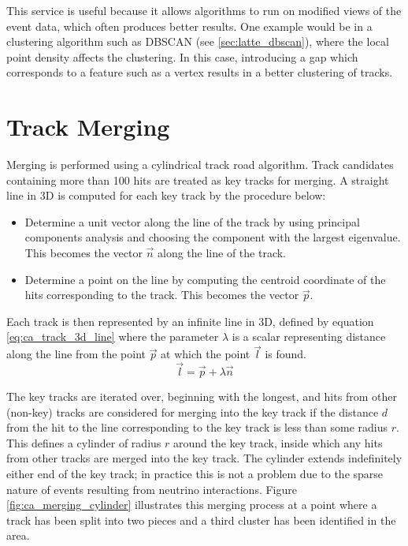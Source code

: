 This service is useful because it allows algorithms to run on modified views of the event data, which often produces better results. One example would be in a clustering algorithm such as DBSCAN (see \ref{sec:latte_dbscan}), where the local point density affects the clustering. In this case, introducing a gap which corresponds to a feature such as a vertex results in a better clustering of tracks.

\section{Track Merging}\label{sec:cellularautomaton_merging}
Merging is performed using a cylindrical track road algorithm. Track candidates containing more than 100 hits are treated as key tracks for merging. A straight line in 3D is computed for each key track by the procedure below:

\begin{itemize}
	\item Determine a unit vector along the line of the track by using principal components analysis and choosing the component with the largest eigenvalue. This becomes the vector $\vec{n}$ along the line of the track.
	\item Determine a point on the line by computing the centroid coordinate of the hits corresponding to the track. This becomes the vector $\vec{p}$.
\end{itemize}

Each track is then represented by an infinite line in 3D, defined by equation \ref{eq:ca_track_3d_line} where the parameter $\lambda$ is a scalar representing distance along the line from the point $\vec{p}$ at which the point $\vec{l}$ is found.
\begin{equation}\label{eq:ca_track_3d_line}
\vec{l} = \vec{p} + \lambda \vec{n}
\end{equation}

The key tracks are iterated over, beginning with the longest, and hits from other (non-key) tracks are considered for merging into the key track if the distance $d$ from the hit to the line corresponding to the key track is less than some radius $r$. This defines a cylinder of radius $r$ around the key track, inside which any hits from other tracks are merged into the key track. The cylinder extends indefinitely either end of the key track; in practice this is not a problem due to the sparse nature of events resulting from neutrino interactions. Figure \ref{fig:ca_merging_cylinder} illustrates this merging process at a point where a track has been split into two pieces and a third cluster has been identified in the area.

